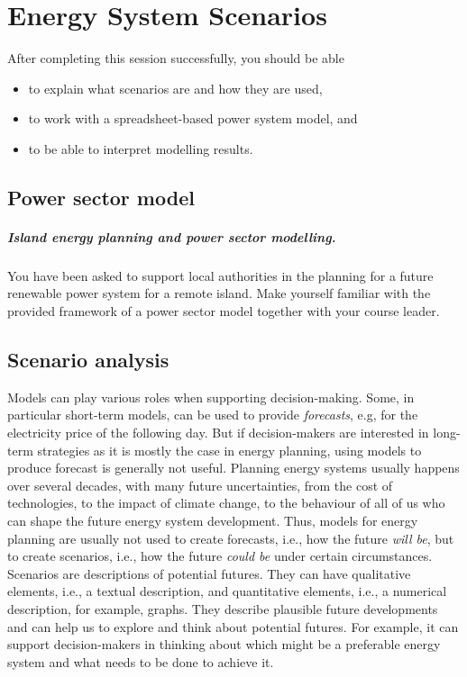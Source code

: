 \setchapterpreamble[u]{\margintoc}
\chapter{Energy System Scenarios}

After completing this session successfully, you should be able

\begin{itemize}
    \item to explain what scenarios are and how they are used,
    \item to work with a spreadsheet-based power system model, and
    \item to be able to interpret modelling results.

\end{itemize}


\section{Power sector model}

\paragraph*{Island energy planning and power sector modelling.}
\begin{kaobox}[frametitle=Task]
You have been asked to support local authorities in the planning for a future renewable power system for a remote island. Make yourself familiar with the provided framework of a power sector model together with your course leader.
\end{kaobox}


\section{Scenario analysis}


Models can play various roles when supporting decision-making.  Some, in particular short-term models, can be used to provide \textit{forecasts}, e.g, for the electricity price of the following day. But if decision-makers are interested in long-term strategies as it is mostly the case in energy planning, using models to produce forecast is generally not useful. Planning energy systems usually happens over several decades, with many future uncertainties, from the cost of technologies, to the impact of climate change, to the behaviour of all of us who can shape the future energy system development. Thus, models for energy planning are usually not used to create forecasts, i.e., how the future \textit{will be}, but to create scenarios, i.e., how the future \textit{could be} under certain circumstances. Scenarios are descriptions of potential futures. They can have qualitative elements, i.e., a textual description, and quantitative elements, i.e., a numerical description, for example, graphs. They describe plausible future developments and can help us to explore and think about potential futures. For example, it can support decision-makers in thinking about which might be a preferable energy system and what needs to be done to achieve it.\cite{mcdowall_reflecting_2014}


